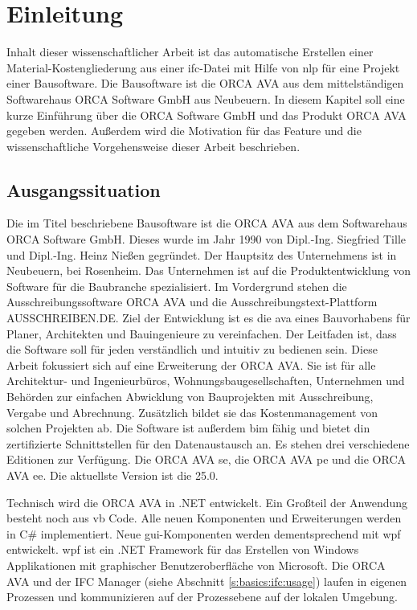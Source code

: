 \section{Einleitung}
\label{s:intro}

Inhalt dieser wissenschaftlicher Arbeit ist das automatische Erstellen einer Material-Kostengliederung aus einer \ac{ifc}-Datei mit Hilfe von \ac{nlp} für eine Projekt einer Bausoftware. Die Bausoftware ist die ORCA AVA aus dem mittelständigen Softwarehaus \glqq ORCA Software GmbH\grqq{} aus Neubeuern. 
In diesem Kapitel soll eine kurze Einführung über die \glqq ORCA Software GmbH\grqq{} und das Produkt  ORCA AVA gegeben werden. Außerdem wird die Motivation für das Feature und die wissenschaftliche Vorgehensweise dieser Arbeit beschrieben.

\subsection{Ausgangssituation}
\label{c:intro:start}

Die im Titel beschriebene Bausoftware ist die ORCA AVA aus dem Softwarehaus \glqq ORCA Software GmbH\grqq{}. Dieses wurde im Jahr 1990 von Dipl.-Ing. Siegfried Tille und Dipl.-Ing. Heinz Nießen gegründet. Der Hauptsitz des Unternehmens ist in Neubeuern, bei Rosenheim. Das Unternehmen ist auf die Produktentwicklung von Software für die Baubranche spezialisiert. Im Vordergrund stehen die Ausschreibungssoftware ORCA AVA und die Ausschreibungstext-Plattform AUSSCHREIBEN.DE. Ziel der Entwicklung ist es die \ac{ava} eines Bauvorhabens für Planer, Architekten und Bauingenieure zu vereinfachen. Der Leitfaden ist, dass die Software soll für jeden verständlich und intuitiv zu bedienen sein.
Diese Arbeit fokussiert sich auf eine Erweiterung der ORCA AVA. Sie ist für alle Architektur- und
Ingenieurbüros, Wohnungsbaugesellschaften, Unternehmen und Behörden zur einfachen Abwicklung von Bauprojekten mit Ausschreibung, Vergabe und Abrechnung. Zusätzlich bildet sie das Kostenmanagement von solchen Projekten ab. Die Software ist außerdem \ac{bim} fähig und bietet \ac{din} zertifizierte Schnittstellen für den Datenaustausch an. Es stehen drei verschiedene Editionen zur Verfügung. Die ORCA AVA \ac{se}, die ORCA AVA \ac{pe} und die ORCA AVA \ac{ee}.  Die aktuellste Version ist die 25.0.

Technisch wird die ORCA AVA in .NET entwickelt. Ein Großteil der Anwendung besteht noch aus \ac{vb} Code. Alle neuen Komponenten und Erweiterungen werden in C\# implementiert. Neue \ac{gui}-Komponenten werden dementsprechend mit \ac{wpf} entwickelt. \ac{wpf} ist ein .NET Framework für das Erstellen von Windows Applikationen mit graphischer Benutzeroberfläche von Microsoft. \citep{Microsoft_2022} Die ORCA AVA und der IFC Manager (siehe Abschnitt \ref{s:basics:ifc:usage}) laufen in eigenen Prozessen und kommunizieren auf der Prozessebene auf der lokalen Umgebung. 

